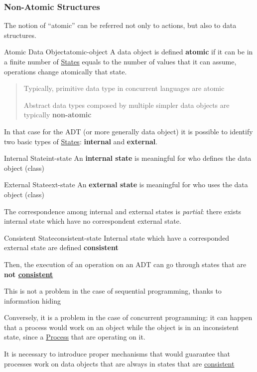 \subsubsection{Non-Atomic Structures}\label{sub:cp_non_atomic_structures} %
The notion of ``atomic'' can be referred not only to actions, but also to data structures.
\begin{definition}{Atomic Data Object}{atomic-object}
    A data object is defined \textbf{atomic} if it can be in a finite number of \hyperref[def:state]{States} equals to the number of values that it can assume, operations change atomically that state.
\end{definition}
\begin{quote}
    Typically, primitive data type in concurrent languages are atomic
    \begin{warning}
        Abstract data types composed by multiple simpler data objects are typically \textbf{non-atomic}
    \end{warning}
\end{quote}
In that case for the ADT (or more generally data object) it is possible to identify two basic types of \hyperref[def:state]{States}: \textbf{internal} and \textbf{external}.
\begin{definition}{Internal State}{int-state}
    An \textbf{internal state} is meaningful for who defines the data object (class)
\end{definition}
\begin{definition}{External State}{ext-state}
    An \textbf{external state} is meaningful for who uses the data object (class)
\end{definition}
The correspondence among internal and external states is \textit{partial}: there exists internal state which have no correspondent external state.
\begin{definition}{Consistent State}{consistent-state}
    Internal state which have a corresponded external state are defined \textbf{consistent}
\end{definition}
Then, the execution of an operation on an ADT can go through states that are \textbf{not \hyperref[def:consistent-state]{consistent}}
\begin{note}
    This is not a problem in the case of sequential programming, thanks to information hiding
    \begin{critical}
        Conversely, it is a problem in the case of concurrent programming: it can happen that a process would work on an object while the object is in an inconsistent state, since a \hyperref[def:process]{Process} that are operating on it.
    \end{critical}
\end{note}
\begin{remark}{}{}
    It is necessary to introduce proper mechanisms that would guarantee that processes work on data objects that are always in states that are \hyperref[def:consistent-state]{consistent}
\end{remark}
%
